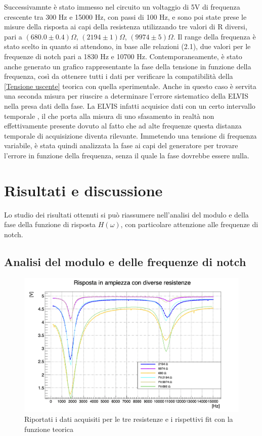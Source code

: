 \documentclass[leqno]{article}
\begin{document}
	Successivamnte è stato immesso nel circuito un voltaggio di 5V di frequenza crescente tra 300 Hz e 15000 Hz, con passi di 100 Hz,
	e sono poi state prese le misure della risposta ai capi della resistenza utilizzando tre valori di R diversi, pari a $(680.0\pm0.4) \Omega$, $(2194\pm1)  \Omega$, $(9974\pm5) \Omega$.
	Il range della frequenza è stato scelto in quanto si attendono, in base alle relazioni (2.1), due valori per le frequenze di notch pari a 
	1830 Hz e 10700 Hz.
	Contemporaneamente, è stato anche generato un grafico rappresentante la fase della tensione in funzione della frequenza, così da ottenere tutti i dati per verificare la compatibilità della \eqref{Tensione uscente} teorica con quella sperimentale. Anche in questo caso è servita una seconda misura per riuscire a determinare l'errore sistematico della ELVIS nella presa dati della fase.
	La ELVIS infatti acquisice dati con un certo intervallo temporale , il che porta alla misura di uno sfasamento in realtà non effettivamente presente dovuto al fatto che ad alte frequenze questa distanza temporale di acquisizione diventa rilevante. Immetendo una tensione di frequenza variabile, è stata quindi analizzata la fase ai capi del generatore per trovare l'errore in funzione della frequenza, senza il quale la fase dovrebbe essere nulla.
	
	
	
	
	
	
	\section{Risultati e discussione}
	Lo studio dei risultati ottenuti si può riassumere nell'analisi del modulo e della fase della funzione di risposta $H(\omega)$, con particolare attenzione alle frequenze di notch.
	\subsection{Analisi del modulo e delle frequenze di notch}
	
	\begin{figure} [h!]
		\centering
		\includegraphics [scale=0.23] {Rispostampiezza.png}
		\caption{Riportati i dati acquisiti per le tre resistenze e i rispettivi fit con la funzione teorica}
		\label{RisAmp}
	\end{figure}
	
\end{document}
